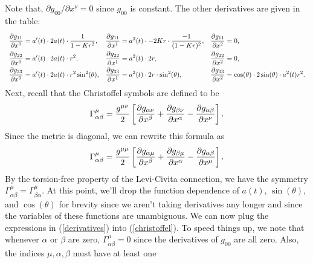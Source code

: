 \documentclass{lkx_pset}
\begin{document}
\begin{solution}
	Note that, $\partial g_{00}/\partial x^\nu = 0$ since $g_{00}$ is constant. The other derivatives are given in the table:
	\begin{equation}\label{derivatives}
		\everymath={\displaystyle}
		\renewcommand*{\arraystretch}{2}
		\begin{array}{lll}
			\pp{g_{11}}{x^0} = a'(t)\cdot 2a(t)\cdot \frac{1}{1-Kr^2},
			 & \pp{g_{11}}{x^1} = a^2(t)\cdot -2Kr\cdot \frac{-1}{(1-Kr)^2},
			 & \pp{g_{11}}{x^2} = 0,                                              \\
			\pp{g_{22}}{x^0} = a'(t)\cdot 2a(t)\cdot r^2,
			 & \pp{g_{22}}{x^1} = a^2(t)\cdot 2r,
			 & \pp{g_{22}}{x^2} = 0,                                              \\
			\pp{g_{33}}{x^0} = a'(t)\cdot 2a(t)\cdot r^2\sin^2(\theta),
			 & \pp{g_{33}}{x^1} = a^2(t)\cdot 2r\cdot \sin^2(\theta),
			 & \pp{g_{33}}{x^2} = \cos(\theta)\cdot 2\sin(\theta)\cdot a^2(t)r^2. \\
		\end{array}
	\end{equation}
	Next, recall that the Christoffel symbols are defined to be
	\[
		\Gamma^\mu_{\alpha\beta} = \frac{g^{\mu\nu}}{2}\left[\frac{\partial g_{\alpha\nu}}{\partial x^\beta} + \frac{\partial g_{\beta\nu}}{\partial x^\alpha} -\frac{\partial g_{\alpha\beta}}{\partial x^\nu}\right].
	\]
	Since the metric is diagonal, we can rewrite this formula as
	\begin{equation}\label{christoffel}
		\Gamma_{\alpha\beta}^\mu = \frac{g^{\mu\mu}}{2}\left[ \frac{\partial g_{\alpha \mu}}{\partial x^\beta} + \frac{\partial g_{\beta \mu}}{\partial x^\alpha} - \frac{\partial g_{\alpha\beta}}{\partial x^\mu}\right].
	\end{equation}
	By the torsion-free property of the Levi-Civita connection, we have the symmetry $\Gamma^\mu_{\alpha\beta}=\Gamma^\mu_{\beta\alpha}$. At this point, we'll drop the function dependence of $a(t)$, $\sin(\theta)$, and $\cos(\theta)$ for brevity since we aren't taking derivatives any longer and since the variables of these functions are unambiguous. We can now plug the expressions in (\ref{derivatives}) into (\ref{christoffel}). To speed things up, we note that whenever $\alpha$ or $\beta$ are zero, $\Gamma^\mu_{\alpha\beta}=0$ since the derivatives of $g_{00}$ are all zero. Also, the indices $\mu,\alpha,\beta$ must have at least one


\end{solution}
\end{document}
